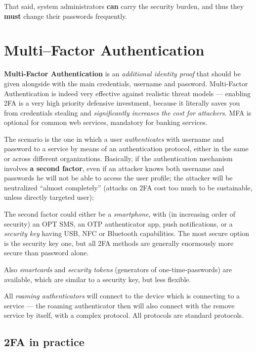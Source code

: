 \documentclass[10pt]{extreport}
\begin{document}
That said, system administrators \textbf{can} carry the security burden, and
thus they \textbf{must} change their passwords frequently.

\chapter{Multi--Factor Authentication}

\textbf{Multi\--Factor Authentication} is an \emph{additional identity proof}
that should be given alongside with the main credentials, username and
password. Multi\--Factor Authentication is indeed very effective against
realistic threat models --- enabling 2FA is a very high priority defensive
investment, because it literally saves you from credentials stealing and
\emph{significantly increases the cost for attackers}. MFA is optional for
common web services, mandatory for banking services.

The scenario is the one in which a user \emph{authenticates} with username and
password to a service by means of an authentication protocol, either in the
same or across different organizations. Basically, if the authentication
mechanism involves \textbf{a second factor}, even if an attacker knows both
username and passwords he will not be able to access the user profile; the
attacker will be neutralized ``almost completely'' (attacks on 2FA cost too
much to be sustainable, unless directly targeted user);

The second factor could either be a \emph{smartphone}, with (in increasing
order of security) an OPT SMS, an OTP authenticator app, push notifications, or
a \emph{security key} having USB, NFC or Bluetooth capabilities. The most
secure option is the security key one, but all 2FA methods are generally
enormously more secure than password alone.

Also \emph{smartcards} and \emph{security tokens} (generators of
one\--time\--passwords) are available, which are similar to a security key, but
less flexible.

All \emph{roaming authenticators} will connect to the device which is
connecting to a service --- the roaming authenticator then will also connect
with the remove service by itself, with a complex protocol. All protocols are
standard protocols.

\section{2FA in practice}
\end{document}
